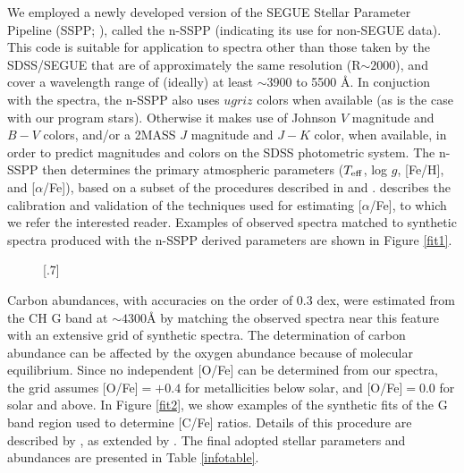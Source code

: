 \documentclass[iop]{emulateapj}
\def\teff{$T_{\rm eff}$}
\def\logg{log $g$}
\begin{document}
We employed a newly developed version of the SEGUE Stellar Parameter
Pipeline (SSPP; \citealt{lee1,lee2,allende08}), called the n-SSPP
(indicating its use for non-SEGUE data). This code is suitable for
application to spectra other than those taken by the SDSS/SEGUE that
are of approximately the same resolution (R$\sim 2000$), and cover a
wavelength range of (ideally) at least $\sim$3900 to 5500 \AA{}. In
conjuction with the spectra, the n-SSPP also uses $ugriz$ colors
when available (as is the case with our program stars). Otherwise it
makes use of Johnson $V$ magnitude and $B-V$ colors, and/or a 2MASS
\citep{2mass} $J$ magnitude and $J-K$ color, when available, in order
to predict magnitudes and colors on the SDSS photometric system. The
n-SSPP then determines the primary atmospheric parameters (\teff{},
\logg{}, [Fe/H], and [$\alpha$/Fe]), based on a subset of the
procedures described in \citet{lee1} and
\citet{lee2010}. \citet{lee2010} describes the calibration and
validation of the techniques used for estimating [$\alpha$/Fe], to
which we refer the interested reader. Examples of observed spectra
matched to synthetic spectra produced with the n-SSPP derived
parameters are shown in Figure \ref{fit1}.


\begin{figure*}
\begin{center}
\scalebox{.7}[.7]{ }
\end{center}
\end{figure*} 

Carbon abundances, with accuracies on the order of 0.3 dex, were
estimated from the CH G band at $\sim 4300$\AA{} by matching the
observed spectra near this feature with an extensive grid of synthetic
spectra. The determination of carbon abundance can be affected by the
oxygen abundance because of molecular equilibrium. Since no
independent [O/Fe] can be determined from our spectra, the grid
assumes [O/Fe]$ = +0.4$ for metallicities below solar, and [O/Fe]$
=0.0$ for solar and above. In Figure \ref{fit2}, we show examples of
the synthetic fits of the G band region used to determine [C/Fe]
ratios. Details of this procedure are described by
\citet{beers07b}, as extended by \citet{carollo11}. The final adopted
stellar parameters and abundances are presented in Table
\ref{infotable}.
\end{document}
